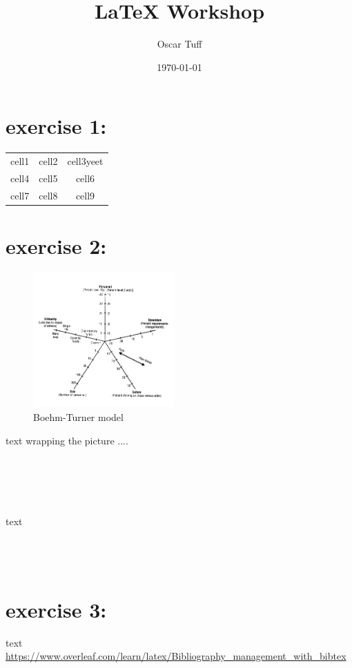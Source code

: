 \documentclass{article}
\title{LaTeX Workshop}
\author{Oscar Tuff}
\date{\today}
\begin{document}
\maketitle
\tableofcontents
\newpage
\section{exercise 1:}
\begin{center}
	\begin{tabular}{ |c|c|c| }
		\hline
		cell1 & cell2 & cell3yeet \\
		cell4 & cell5 & cell6     \\
		cell7 & cell8 & cell9     \\
		\hline
	\end{tabular}
\end{center}

\section{exercise 2:}
\begin{figure}
	\vspace{-30pt}
	\includegraphics[width=0.48\textwidth]{boehmturner}
	\caption{Boehm-Turner model}
\end{figure}
text wrapping the picture ....
\\
\\
\\
\\
\\
\\
text \cite{lamport94}
\\
\\
\\
\\
\section{exercise 3:}
text \cite{texbook}
\\
\url{https://www.overleaf.com/learn/latex/Bibliography_management_with_bibtex}
\end{document}
